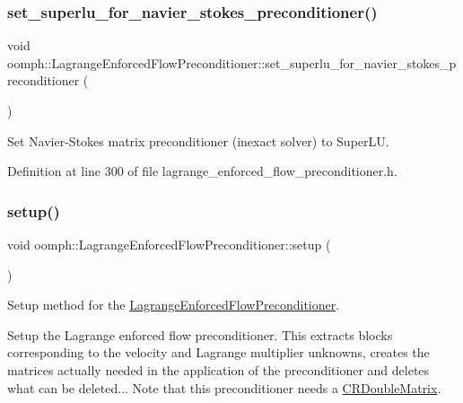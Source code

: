 \subsubsection{\texorpdfstring{set\+\_\+superlu\+\_\+for\+\_\+navier\+\_\+stokes\+\_\+preconditioner()}{set\_superlu\_for\_navier\_stokes\_preconditioner()}}
{\footnotesize\ttfamily void oomph\+::\+Lagrange\+Enforced\+Flow\+Preconditioner\+::set\+\_\+superlu\+\_\+for\+\_\+navier\+\_\+stokes\+\_\+preconditioner (\begin{DoxyParamCaption}{ }\end{DoxyParamCaption})\hspace{0.3cm}{\ttfamily [inline]}}



Set Navier-\/\+Stokes matrix preconditioner (inexact solver) to Super\+LU. 



Definition at line 300 of file lagrange\+\_\+enforced\+\_\+flow\+\_\+preconditioner.\+h.

\mbox{\label{classoomph_1_1LagrangeEnforcedFlowPreconditioner_aadcbdb5af92d7889c956098cb86dee87}} 
\subsubsection{\texorpdfstring{setup()}{setup()}}
{\footnotesize\ttfamily void oomph\+::\+Lagrange\+Enforced\+Flow\+Preconditioner\+::setup (\begin{DoxyParamCaption}{ }\end{DoxyParamCaption})\hspace{0.3cm}{\ttfamily [virtual]}}



Setup method for the \hyperlink{classoomph_1_1LagrangeEnforcedFlowPreconditioner}{Lagrange\+Enforced\+Flow\+Preconditioner}. 

Setup the Lagrange enforced flow preconditioner. This extracts blocks corresponding to the velocity and Lagrange multiplier unknowns, creates the matrices actually needed in the application of the preconditioner and deletes what can be deleted... Note that this preconditioner needs a \hyperlink{classoomph_1_1CRDoubleMatrix}{C\+R\+Double\+Matrix}. 

